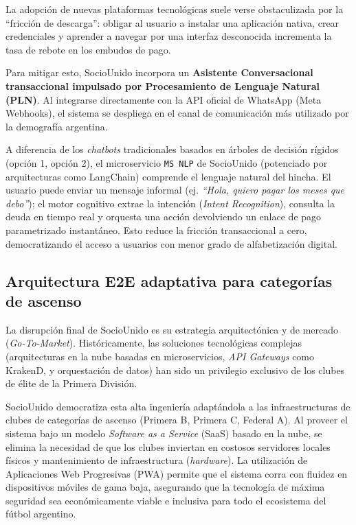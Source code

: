La adopción de nuevas plataformas tecnológicas suele verse obstaculizada por la ``fricción de descarga'': obligar al usuario a instalar una aplicación nativa, crear credenciales y aprender a navegar por una interfaz desconocida incrementa la tasa de rebote en los embudos de pago.

Para mitigar esto, SocioUnido incorpora un \textbf{Asistente Conversacional transaccional impulsado por Procesamiento de Lenguaje Natural (PLN)}. Al integrarse directamente con la API oficial de WhatsApp (Meta Webhooks), el sistema se despliega en el canal de comunicación más utilizado por la demografía argentina. 

A diferencia de los \textit{chatbots} tradicionales basados en árboles de decisión rígidos (opción 1, opción 2), el microservicio \texttt{MS NLP} de SocioUnido (potenciado por arquitecturas como LangChain) comprende el lenguaje natural del hincha. El usuario puede enviar un mensaje informal (ej. \textit{``Hola, quiero pagar los meses que debo''}); el motor cognitivo extrae la intención (\textit{Intent Recognition}), consulta la deuda en tiempo real y orquesta una acción devolviendo un enlace de pago parametrizado instantáneo. Esto reduce la fricción transaccional a cero, democratizando el acceso a usuarios con menor grado de alfabetización digital.

\subsection{Arquitectura E2E adaptativa para categorías de ascenso}

La disrupción final de SocioUnido es su estrategia arquitectónica y de mercado (\textit{Go-To-Market}). Históricamente, las soluciones tecnológicas complejas (arquitecturas en la nube basadas en microservicios, \textit{API Gateways} como KrakenD, y orquestación de datos) han sido un privilegio exclusivo de los clubes de élite de la Primera División. 

SocioUnido democratiza esta alta ingeniería adaptándola a las infraestructuras de clubes de categorías de ascenso (Primera B, Primera C, Federal A). Al proveer el sistema bajo un modelo \textit{Software as a Service} (SaaS) basado en la nube, se elimina la necesidad de que los clubes inviertan en costosos servidores locales físicos y mantenimiento de infraestructura (\textit{hardware}). La utilización de Aplicaciones Web Progresivas (PWA) permite que el sistema corra con fluidez en dispositivos móviles de gama baja, asegurando que la tecnología de máxima seguridad sea económicamente viable e inclusiva para todo el ecosistema del fútbol argentino.
